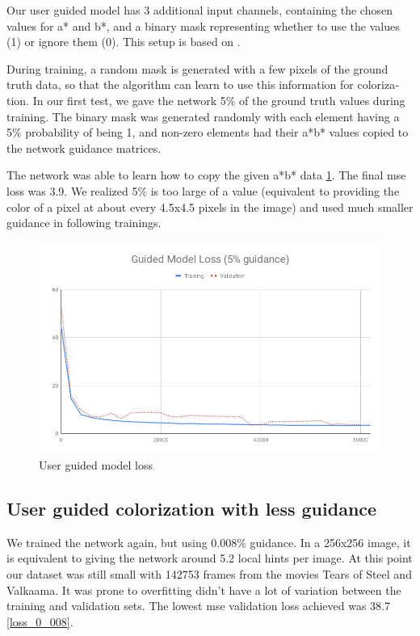 \documentclass[12pt,openright,oneside,a4paper,english]{abntex2}
\begin{document}
\begin{otherlanguage}{english}
    Our user guided model has 3 additional input channels, containing the chosen values for a* and b*, and a binary mask representing whether to use the values (1) or ignore them (0). This setup is based on \cite{Zhang2017}.

    During training, a random mask is generated with a few pixels of the ground truth data, so that the algorithm can learn to use this information for colorization. In our first test, we gave the network 5\% of the ground truth values during training. The binary mask was generated randomly with each element having a 5\% probability of being 1, and non-zero elements had their a*b* values copied to the network guidance matrices.

    The network was able to learn how to copy the given a*b* data \ref{loss_5}. The final \acrshort{mse} loss was 3.9. We realized 5\% is too large of a value (equivalent to providing the color of a pixel at about every 4.5x4.5 pixels in the image) and used much smaller guidance in following trainings.

    \begin{figure}[!htb]
    \centering
    \includegraphics[width=\textwidth]{loss/Guided_5}
    \caption{User guided model loss}
    \label{loss_5}
    \end{figure}

    \subsection{User guided colorization with less guidance}

    We trained the network again, but using 0.008\% guidance. In a 256x256 image, it is equivalent to giving the network around 5.2 local hints per image. At this point our dataset was still small with 142753 frames from the movies Tears of Steel and Valkaama. It was prone to overfitting didn't have a lot of variation between the training and validation sets. The lowest \acrshort{mse} validation loss achieved  was 38.7 \ref{loss_0_008}.


\end{otherlanguage}
\end{document}
